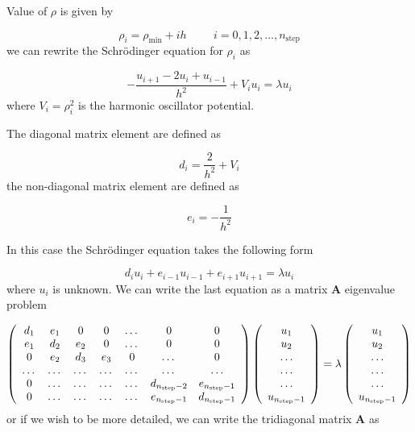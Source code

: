 \documentclass[10pt]{article}
\begin{document}
Value of $\rho $ is given by

\begin{equation}
\rho _{i}=\rho _{\mathrm{min}}+ih\hspace{1cm}i=0,1,2,\dots ,n_{\mathrm{step}}
\end{equation}
we can rewrite the Schr\"{o}dinger equation for $\rho _{i}$ as

\begin{equation}
-\frac{u_{i+1}-2u_{i}+u_{i-1}}{h^{2}}+V_{i}u_{i}=\lambda u_{i}
\end{equation}
where $V_{i}=\rho _{i}^{2}$ is the harmonic oscillator potential. 

The diagonal matrix element are defined as

\begin{equation}
d_{i}=\frac{2}{h^{2}}+V_{i}
\end{equation}
the non-diagonal matrix element are
defined as 

\begin{equation}
e_{i}=-\frac{1}{h^{2}}
\end{equation}

In this case the Schr\"{o}dinger equation takes the following form

\begin{equation}
d_{i}u_{i}+e_{i-1}u_{i-1}+e_{i+1}u_{i+1}=\lambda u_{i}
\end{equation}
where $u_{i}$ is unknown. We can write the last equation as a matrix $%
\mathbf{A}$ eigenvalue problem

\[
\left( 
\begin{array}{ccccccc}
d_{1} & e_{1} & 0 & 0 & \dots  & 0 & 0 \\ 
e_{1} & d_{2} & e_{2} & 0 & \dots  & 0 & 0 \\ 
0 & e_{2} & d_{3} & e_{3} & 0 & \dots  & 0 \\ 
\dots  & \dots  & \dots  & \dots  & \dots  & \dots  & \dots  \\ 
0 & \dots  & \dots  & \dots  & \dots  & d_{n_{\mathrm{step}}-2} & e_{n_{%
		\mathrm{step}}-1} \\ 
0 & \dots  & \dots  & \dots  & \dots  & e_{n_{\mathrm{step}}-1} & d_{n_{%
		\mathrm{step}}-1}%
\end{array}%
\right) \left( 
\begin{array}{c}
u_{1} \\ 
u_{2} \\ 
\dots  \\ 
\dots  \\ 
\dots  \\ 
u_{n_{\mathrm{step}}-1}%
\end{array}%
\right) =\lambda \left( 
\begin{array}{c}
u_{1} \\ 
u_{2} \\ 
\dots  \\ 
\dots  \\ 
\dots  \\ 
u_{n_{\mathrm{step}}-1}%
\end{array}%
\right) 
\]%
or if we wish to be more detailed, we can write the tridiagonal matrix $%
\mathbf{A}$ as
\end{document}
